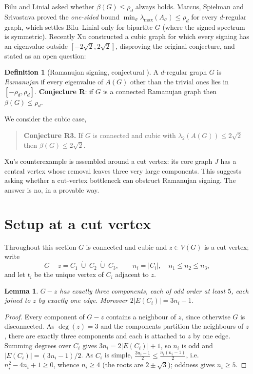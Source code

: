 \documentclass[11pt,a4paper]{article}
\theoremstyle{plain}
\newtheorem{lemma}[theorem]{Lemma}
\theoremstyle{definition}
\newtheorem{definition}[theorem]{Definition}
\newcommand{\sgn}{\sigma}
\newcommand{\bdG}{A(G)}
\begin{document}
Bilu and Linial \cite{bl06} asked whether $\beta(G)\le\rho_d$ always holds.
Marcus, Spielman and Srivastava \cite{mss15} proved the \emph{one-sided} bound
$\min_{\sgn}\lambda_{\max}(A_{\sgn})\le\rho_d$ for every $d$-regular graph,
which settles Bilu--Linial only for bipartite $G$ (where the signed spectrum is
symmetric). Recently Xu \cite{xu26} constructed a cubic graph for which every
signing has an eigenvalue outside $[-2\sqrt2,2\sqrt2]$, disproving the original
conjecture, and stated as an open question:

\begin{definition}[Ramanujan signing, conjectural \cite{xu26}]
A $d$-regular graph $G$ is \emph{Ramanujan} if every eigenvalue of $\bdG$ other
than the trivial ones lies in $[-\rho_d,\rho_d]$. \textbf{Conjecture R}: if $G$
is a connected Ramanujan graph then $\beta(G)\le\rho_d$.
\end{definition}

We consider the cubic case,
\begin{quote}\textbf{Conjecture R3.} If $G$ is connected and cubic with
$\lambda_2(\bdG)\le2\sqrt2$ then $\beta(G)\le2\sqrt2$.\end{quote}

Xu's counterexample is assembled around a cut vertex: its core graph $J$ has a
central vertex whose removal leaves three very large components. This suggests
asking whether a cut-vertex bottleneck can obstruct Ramanujan signing. The
answer is no, in a provable way.

\section{Setup at a cut vertex}

Throughout this section $G$ is connected and cubic and $z\in V(G)$ is a cut
vertex; write
\[
  G-z=C_1\;\dot\cup\;C_2\;\dot\cup\;C_3,\qquad n_i=|C_i|,\quad n_1\le n_2\le n_3,
\]
and let $t_i$ be the unique vertex of $C_i$ adjacent to $z$.

\begin{lemma}
$G-z$ has exactly three components, each of odd order at least $5$, each joined
to $z$ by exactly one edge. Moreover $2|E(C_i)|=3n_i-1$.
\end{lemma}

\begin{proof}
Every component of $G-z$ contains a neighbour of $z$, since otherwise $G$ is
disconnected. As $\deg(z)=3$ and the components partition the neighbours of $z$,
there are exactly three components and each is attached to $z$ by one edge.
Summing degrees over $C_i$ gives $3n_i=2|E(C_i)|+1$, so $n_i$ is odd and
$|E(C_i)|=(3n_i-1)/2$. As $C_i$ is simple,
$\tfrac{3n_i-1}{2}\le\tfrac{n_i(n_i-1)}{2}$, i.e.\ $n_i^2-4n_i+1\ge0$, whence
$n_i\ge4$ (the roots are $2\pm\sqrt3$); oddness gives $n_i\ge5$.
\end{proof}
\end{document}
